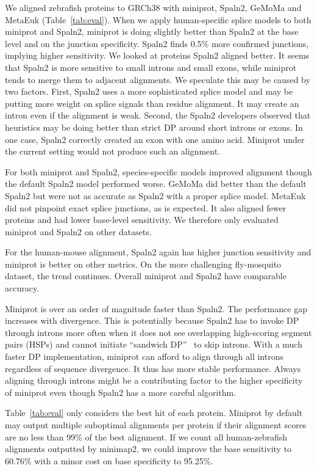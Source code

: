 \documentclass{bioinfo}
\begin{document}
We aligned zebrafish proteins to GRCh38 with miniprot, Spaln2, GeMoMa and MetaEuk
(Table~\ref{tab:eval}). When we apply human-specific splice models to both
miniprot and Spaln2, miniprot is doing slightly better than Spaln2 at the base
level and on the junction specificity. Spaln2 finds 0.5\% more confirmed junctions,
implying higher sensitivity. We looked at proteins Spaln2 aligned better. It
seems that Spaln2 is more sensitive to small introns and small exons, while
miniprot tends to merge them to adjacent alignments. We speculate this may be
caused by two factors. First, Spaln2 uses a more sophisticated splice model and
may be putting more weight on splice signals than residue alignment. It may
create an intron even if the alignment is weak. Second, the Spaln2 developers
observed that heuristics may be doing better than strict DP around short
introns or exons. In one case, Spaln2 correctly created an exon with one amino
acid. Miniprot under the current setting would not produce such an alignment.

For both miniprot and Spaln2, species-specific models improved alignment though
the default Spaln2 model performed worse. GeMoMa did better than the default
Spaln2 but were not as accurate as Spaln2 with a proper splice model. MetaEuk
did not pinpoint exact splice junctions, as is expected. It also aligned fewer
proteins and had lower base-level sensitivity. We therefore only evaluated
miniprot and Spaln2 on other datasets.

For the human-mouse alignment, Spaln2 again has higher junction sensitivity and
miniprot is better on other metrics. On the more challenging fly-mosquito
dataset, the trend continues. Overall miniprot and Spaln2 have comparable
accuracy.

Miniprot is over an order of magnitude faster than Spaln2. The performance gap
increases with divergence. This is potentially because Spaln2 has to invoke DP
through introns more often when it does not see overlapping high-scoring
segment pairs (HSPs) and cannot initiate ``sandwich DP''~\citep{Wu:2005vn} to
skip introns. With a much faster DP implementation, miniprot can afford to
align through all introns regardless of sequence divergence. It thus has more
stable performance. Always aligning through introns might be a contributing
factor to the higher specificity of miniprot even though Spaln2 has a more
careful algorithm.

Table~\ref{tab:eval} only considers the best hit of each protein. Miniprot by
default may output multiple suboptimal alignments per protein if their
alignment scores are no less than 99\% of the best alignment. If we count all
human-zebrafish alignments outputted by minimap2, we could improve the base
sensitivity to 60.76\% with a minor cost on base specificity to 95.25\%.
\end{document}
